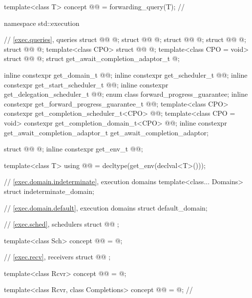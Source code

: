 \begin{codeblock}
{  template<class T>
    concept @@ = forwarding_query(T{});           // \expos
}

namespace std::execution {
  // \ref{exec.queries}, queries
  struct @@ { @\unspec@ };
  struct @@ { @\unspec@ };
  struct @@ { @\unspec@ };
  struct @@ { @\unspec@ };
  struct @@ { @\unspec@ };
  template<class CPO>
    struct @@ { @\unspec@ };
  template<class CPO = void>
    struct @@ { @\unspec@ };
  struct get_await_completion_adaptor_t { @\unspec@ };

  inline constexpr get_domain_t @@{};
  inline constexpr get_scheduler_t @@{};
  inline constexpr get_start_scheduler_t @@{};
  inline constexpr get_delegation_scheduler_t @@{};
  enum class forward_progress_guarantee;
  inline constexpr get_forward_progress_guarantee_t @@{};
  template<class CPO>
    constexpr get_completion_scheduler_t<CPO> @@{};
  template<class CPO = void>
    constexpr get_completion_domain_t<CPO> @@{};
  inline constexpr get_await_completion_adaptor_t get_await_completion_adaptor{};

  struct @@ { @\unspec@ };
  inline constexpr get_env_t @@{};

  template<class T>
    using @@ = decltype(get_env(declval<T>()));

  // \ref{exec.domain.indeterminate}, execution domains
  template<class... Domains>
    struct indeterminate_domain;

  // \ref{exec.domain.default}, execution domains
  struct default_domain;

  // \ref{exec.sched}, schedulers
  struct @@ {};

  template<class Sch>
    concept @@ = @\seebelow@;

  // \ref{exec.recv}, receivers
  struct @@ {};

  template<class Rcvr>
    concept @@ = @\seebelow@;

  template<class Rcvr, class Completions>
    concept @@ = @\seebelownc@;                            // \expos

}
\end{codeblock}
